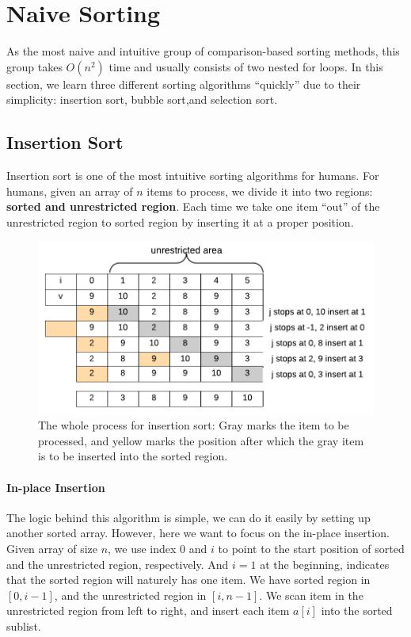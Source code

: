 \documentclass[../main.tex]{subfiles}
\begin{document}
\section{Naive Sorting}
\label{o_n_2_sorting}
As the  most naive and intuitive group of comparison-based sorting methods, this group takes $O(n^2)$ time and  usually consists of two nested for loops. In this section, we learn three different sorting algorithms ``quickly'' due to their simplicity: insertion sort, bubble sort,and selection sort.



\subsection{Insertion Sort}
Insertion sort is one of the most intuitive sorting algorithms for humans. For humans, given an array of $n$ items to process, we divide it into two regions: \textbf{sorted and unrestricted region}. Each time we take one item ``out'' of the unrestricted region  to sorted region by inserting it at a proper position. 

\begin{figure}[!ht]
    \centering
    \includegraphics[width=0.9\columnwidth]{fig/insertion_sort.png}
    \caption{The whole process for insertion sort:  Gray marks the item to be processed, and yellow marks the position after which the gray item is to be inserted into the sorted region.}
    \label{fig:insertion_sort}
\end{figure}



\paragraph{In-place Insertion} The logic behind this algorithm is simple, we can do it easily by setting up another sorted array. However, here we want to focus on the in-place insertion. Given array of size $n$, we use index $0$ and $i$ to point to the start position of sorted and the unrestricted region, respectively. And $i=1$ at the beginning, indicates that the sorted region will naturely has one item. We have sorted region in $[0, i-1]$, and the unrestricted region in $[i, n-1]$. We scan item in the unrestricted region from left to right, and insert each item $a[i]$ into the sorted sublist. 
\end{document}
